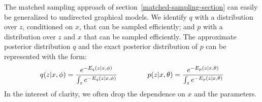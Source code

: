 \documentclass{article} %
\def\KL{\text{KL}}
\begin{document}
The matched sampling approach of section~\ref{matched-sampling-section} can easily be generalized to undirected graphical models.
We identify $q$ with a distribution over $z$, conditioned on $x$, that can be sampled efficiently; and $p$ with a distribution over $z$ and $x$ that can be sampled efficiently.  %
The approximate posterior distribution $q$ and the exact posterior distribution of $p$ can be represented with the form:
\begin{equation} \label{energy-model-equation}
q(z|x, \phi) = \frac{e^{-E_q(z|x, \phi)}}{\int_z e^{-E_q(z|x, \phi)}} \hspace{1.5cm}
p(z|x, \theta) = \frac{e^{-E_p(z|x, \theta)}}{\int_{z} e^{-E_p(z|x, \theta)}}  
\end{equation}
In the interest of clarity, we often drop the dependence on $x$ and the parameters.  


\end{document}
